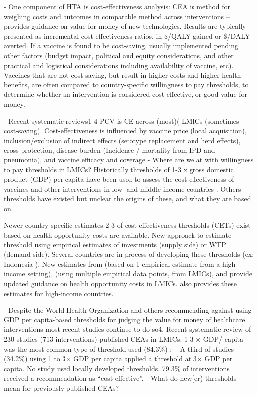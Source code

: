 \documentclass[12pt]{article}
\begin{document}
-	One component of HTA is cost-effectiveness analysis: CEA is method for weighing costs and outcomes in comparable method across interventions – provides guidance on value for money of new technologies. Results are typically presented as incremental cost-effectiveness ratios, in \$/QALY gained or \$/DALY averted. If a vaccine is found to be cost-saving, usually implemented pending other factors (budget impact, political and equity considerations, and other practical and logistical considerations including availability of vaccine, etc). Vaccines that are not cost-saving, but result in higher costs and higher health benefits, are often compared to country-specific willingness to pay thresholds, to determine whether an intervention is considered cost-effective, or good value for money.

-	Recent systematic reviews1-4 PCV is CE across (most)( LMICs (sometimes cost-saving). Cost-effectiveness is influenced by vaccine price (local acquisition), inclusion/exclusion of indirect effects (serotype replacement and herd effects), cross protection, disease burden (Incidence / mortality from IPD and pneumonia), and vaccine efficacy and coverage
-	Where are we at with willingness to pay thresholds in LMICs? Historically thresholds of 1-3 x gross domestic product (GDP) per capita have been used to assess the cost-effectiveness of vaccines and other interventions in low- and middle-income countries . Others thresholds have existed but unclear the origins of these, and what they are based on.

Newer  country-specific estimates 2-3 of cost-effectiveness thresholds (CETs) exist based on health opportunity costs are available. New approach to estimate threshold using empirical estimates of investments (supply side) or WTP (demand side). Several countries are in process of developing these thresholds (ex: Indonesia ). New estimates from \textcite{woods_country-level_2016} (based on 1 empirical estimate from a high-income setting), \textcite{ochalek_estimating_2018} (using multiple empirical data points, from LMICs), and \textcite{pichon-riviere_determining_2023} provide updated guidance on health opportunity costs in LMICs. \textcite{woods_country-level_2016} also provides these estimates for high-income countries.

-	Despite the World Health Organization and others recommending against using GDP per capita-based thresholds for judging the value for money of healthcare interventions most recent studies continue to do so4. Recent systematic review of 230 studies (713 interventions) published CEAs in LMICs: 1-3 × GDP/ capita was the most common type of threshold used (84.3\%) ; ~ A third of studies (34.2\%) using 1 to 3× GDP per capita applied a threshold at 3× GDP per capita. No study used locally developed thresholds. 79.3\% of interventions received a recommendation as “cost-effective”.
-	What do new(er) thresholds mean for previously published CEAs?  
\end{document}
